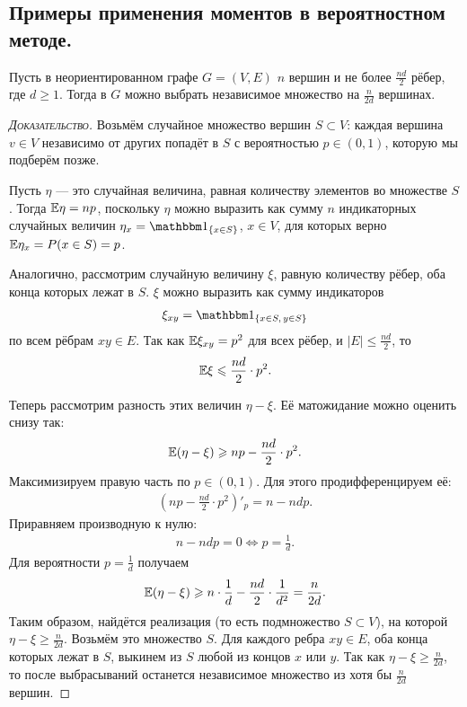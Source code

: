 \documentclass[../main.tex]{subfiles}
\begin{document}
\subsection{Примеры применения моментов в вероятностном методе.}

\begin{exmpl}
 Пусть в неориентированном графе $ G = (V,E) $ $ n $ вершин и не более $ \frac{nd}{2} $ рёбер, где $ d \geqslant 1 $. Тогда в $ G $ можно выбрать независимое множество на $ \frac{n}{2d} $ вершинах.
\end{exmpl}
\begin{proof}[\normalfont\textsc{Доказательство}]
 Возьмём случайное множество вершин $ S \subset V $: каждая вершина $ v \in V $ независимо от других попадёт в $ S $ с вероятностью $ p \in (0,1) $, которую мы подберём позже.

 Пусть $ \eta $ --- это случайная величина, равная количеству элементов во множестве $ S $. Тогда $ \mathbb E\eta = np $, поскольку $ \eta $ можно выразить как сумму $ n $ индикаторных случайных величин $ \eta_x = \Ind_{\left\{ x \in S \right\}} $, $ x \in V $, для которых верно $ \mathbb E\eta_x = P(x \in S) = p $.

 Аналогично, рассмотрим случайную величину $ \xi $, равную количеству рёбер, оба конца которых лежат в $ S $. $ \xi $ можно выразить как сумму индикаторов
 \begin{align*}
  \xi_{xy} = \Ind_{\left\{ x \in S,\, y \in S \right\}}
 \end{align*} по всем рёбрам $ xy \in E $. Так как $ \mathbb E\xi_{xy} = p^{2} $ для всех рёбер, и $ \left| E \right| \leqslant \frac{nd}{2} $, то
 \begin{align*}
  \mathbb E\xi \leqslant \frac{nd}{2} \cdot p^{2}.
 \end{align*}

 Теперь рассмотрим разность этих величин $ \eta-\xi $. Её матожидание можно оценить снизу так:
 \begin{align*}
  \mathbb E(\eta - \xi) \geqslant np - \frac{nd}{2} \cdot p^{2}.
 \end{align*} Максимизируем правую часть по $ p \in (0,1) $. Для этого продифференцируем её:
 \begin{align*}
  \left(np - \frac{nd}{2}\cdot p^{2}\right)'_p = n - ndp.
 \end{align*} Приравняем производную к нулю:
 \begin{align*}
  n - ndp = 0 \iff p = \frac{1}{d}.
 \end{align*} Для вероятности $ p = \frac{1}{d} $ получаем
 \begin{align*}
  \mathbb E(\eta-\xi) \geqslant n \cdot \frac{1}{d} - \frac{nd}{2} \cdot \frac{1}{d^{2}} = \frac{n}{2d}.
 \end{align*} Таким образом, найдётся реализация (то есть подмножество $ S \subset V $), на которой $ \eta - \xi \geqslant \frac{n}{2d} $. Возьмём это множество $ S $. Для каждого ребра $ xy \in E$, оба конца которых лежат в $ S $, выкинем из $ S $ любой из концов $ x $ или $ y $. Так как $ \eta-\xi \geqslant \frac{n}{2d} $, то после выбрасываний останется независимое множество из хотя бы $ \frac{n}{2d} $ вершин.
\end{proof}
\end{document}
